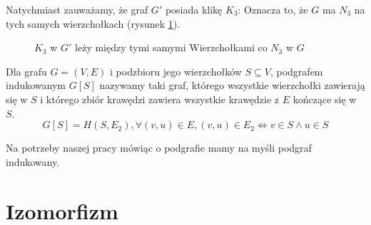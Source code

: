      Natychmiast zauważamy, że graf $G'$ posiada klikę $K_3$:
    Oznacza to, że $G$ ma $N_3$ na tych samych wierzchołkach (rysunek \ref{dopwiesz}).

    \begin{figure}[H]
      \centering
        \hspace{15mm}
        \caption{ $K_3$ w $G'$ leży między tymi samymi Wierzchołkami co $N_3$ w $G$ }
        \label{dopwiesz}
     \end{figure}


     \begin{definition}
       Dla grafu $G=(V,E)$ i podzbioru jego wierzchołków $S \subseteq V$, 
       podgrafem indukowanym $G[S]$ nazywamy taki graf, którego wszystkie wierzchołki
       zawierają się w $S$ i którego zbiór krawędzi zawiera wszystkie krawędzie z $E$ kończące się w $S$.
       $$ G[S] = H(S, E_2), \forall (v,u) \in E, (v,u) \in E_2 \iff v \in S \land u \in S$$ 
     \end{definition}

     Na potrzeby naszej pracy mówiąc o podgrafie mamy na myśli podgraf indukowany.

  \section{Izomorfizm}

